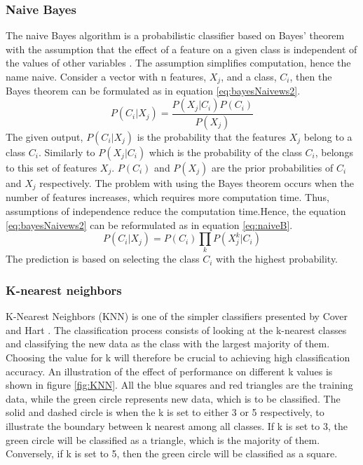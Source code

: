 \documentclass[USenglish]{ifimaster}  %
\begin{document}
\subsubsection{Naive Bayes}
The naive Bayes algorithm is a probabilistic classifier based on Bayes’ theorem with the assumption that the effect of a feature on a given class is independent of the values of other variables \cite{Marsland:2009:MLA:1571643}. The assumption simplifies computation, hence the name naive. Consider a vector with n features, $X_j$, and a class, $C_i$, then the Bayes theorem can be formulated as in equation \ref{eq:bayesNaivews2}.
\begin{equation} 
P(C_i \vert X_j) = \frac{P(X_j \vert C_i)P(C_i)}{P(X_j)}
\label{eq:bayesNaivews2}
\end{equation}
The given output, $P(C_i \vert X_j)$ is the probability that the features $X_j$ belong to a class $C_i$. Similarly to $P(X_j \vert C_i)$ which is the probability of the class $C_i$, belongs to this set of features $X_j$. $P(C_i)$ and $P(X_j)$ are the prior probabilities of $C_i$ and $X_j$ respectively. The problem with using the Bayes theorem occurs when the number of features increases, which requires more computation time. Thus, assumptions of independence reduce the computation time.Hence, the equation \ref{eq:bayesNaivews2} can be reformulated as in equation \ref{eq:naiveB}.
\begin{equation} 
P(C_i \vert X_j)  = P(C_i)\prod_{k}P(X_{j}^{k} \vert C_i)
\label{eq:naiveB}
\end{equation}
The prediction is based on selecting the class $C_i$ with the highest probability.

\subsubsection{K-nearest neighbors}
K-Nearest Neighbors (KNN) is one of the simpler classifiers presented by Cover and Hart \cite{1053964}. The classification process consists of looking at the k-nearest classes and classifying the new data as the class with the largest majority of them. Choosing the value for k will therefore be crucial to achieving high classification accuracy. An illustration of the effect of performance on different k values is shown in figure \ref{fig:KNN}. All the blue squares and red triangles are the training data, while the green circle represents new data, which is to be classified. The solid and dashed circle is when the k is set to either 3 or 5 respectively, to illustrate the boundary between k nearest among all classes. If k is set to 3, the green circle will be classified as a triangle, which is the majority of them. Conversely, if k is set to 5, then the green circle will be classified as a square.
\end{document}

